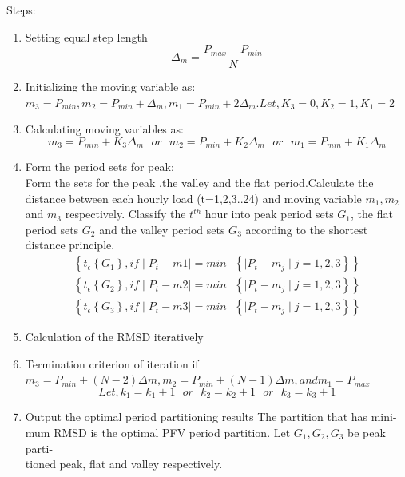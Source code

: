 \documentclass[12pt]{article}
\begin{document}
Steps:
\begin{enumerate}
\item Setting equal step length\\
$$\Delta_{m} = \frac{P_{max}-P_{min}}{N}$$
\item Initializing the moving variable as:\\
$m_{3}=P_{min},m_{2}=P_{min}+\Delta_{m},m_{1}=P_{min}+2\Delta_{m}.Let, K_{3}=0,K_{2}=1,K_{1}=2$
\item Calculating moving variables as:\\
$$m_{3}=P_{min}+K_{3}\Delta_{m}\,\,\,\,or\,\,\,\,m_{2}=P_{min}+K_{2}\Delta_{m}\,\,\,\,or\,\,\,\,m_{1}=P_{min}+K_{1}\Delta_{m}$$
\item Form the period sets for peak:\\
Form the sets for the peak ,the valley and the flat period.Calculate the distance between each hourly load (t=1,2,3..24) and moving variable $m_{1}, m_{2}$ and $m_{3}$ respectively. Classify the $t^{th}$ hour into peak period sets $G_{1}$,  the
flat period sets $G_{2}$ and the valley period sets $G_{3}$ according to the shortest
distance principle.
\begin{eqnarray*}
\left\lbrace t_{\epsilon} \left\lbrace G_{1}\right\rbrace , if  \mid P_{t}-m{1} \mid = min\,\,\,\, \left\lbrace   \mid P_{t}-m_{j} \mid j = 1,2,3\right\rbrace \right\rbrace\\
\left\lbrace t_{\epsilon} \left\lbrace G_{2}\right\rbrace , if  \mid P_{t}-m{2} \mid = min\,\,\,\, \left\lbrace   \mid P_{t}-m_{j} \mid j = 1,2,3\right\rbrace \right\rbrace\\
\left\lbrace t_{\epsilon} \left\lbrace G_{3}\right\rbrace , if  \mid P_{t}-m{3} \mid = min\,\,\,\, \left\lbrace   \mid P_{t}-m_{j} \mid j = 1,2,3\right\rbrace \right\rbrace
\end{eqnarray*}
\item Calculation of the RMSD iteratively
\item  Termination criterion of iteration if\\
$m_{3} = P_{min} + (N-2)\Delta m,  m_{2} = P_{min} + (N-1)\Delta m,  and m_{1} = P_{max}$
$$Let, k_{1} = k_{1}+ 1 \,\,\,\, or \,\,\,\, k_{2} = k_{2}+ 1\,\,\,\, or \,\,\,\, k_{3} = k_{3}+ 1$$
\item  Output the optimal period partitioning results The partition that has mini-\\
mum RMSD is the optimal PFV period partition. Let $ G_{1}, G_{2}, G_{3} $ be peak parti-\\
tioned peak, flat and  valley respectively. \\
\end{enumerate}
\end{document}
